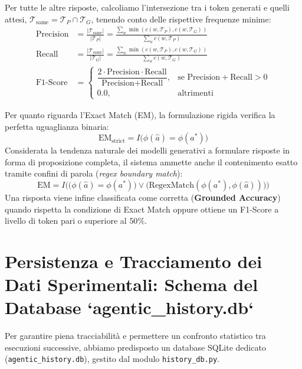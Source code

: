 Per tutte le altre risposte, calcoliamo l'intersezione tra i token generati e quelli attesi, $\mathcal{T}_{\text{same}} = \mathcal{T}_P \cap \mathcal{T}_G$, tenendo conto delle rispettive frequenze minime:
\begin{align}
\text{Precision} &= \frac{|\mathcal{T}_{\text{same}}|}{|\mathcal{T}_P|} = \frac{\sum_{w} \min(c(w, \mathcal{T}_P), c(w, \mathcal{T}_G))}{\sum_{w} c(w, \mathcal{T}_P)} \\[0.2cm]
\text{Recall} &= \frac{|\mathcal{T}_{\text{same}}|}{|\mathcal{T}_G|} = \frac{\sum_{w} \min(c(w, \mathcal{T}_P), c(w, \mathcal{T}_G))}{\sum_{w} c(w, \mathcal{T}_G)} \\[0.2cm]
\text{F1-Score} &= \begin{cases}
    \dfrac{2 \cdot \text{Precision} \cdot \text{Recall}}{\text{Precision} + \text{Recall}}, & \text{se } \text{Precision} + \text{Recall} > 0 \\
    0.0, & \text{altrimenti}
\end{cases}
\end{align}

Per quanto riguarda l'Exact Match (EM), la formulazione rigida verifica la perfetta uguaglianza binaria:
\begin{equation}
\text{EM}_{\text{strict}} = {I}\big(\phi(\hat{a}) = \phi(a^*)\big)
\end{equation}
Considerata la tendenza naturale dei modelli generativi a formulare risposte in forma di proposizione completa, il sistema ammette anche il contenimento esatto tramite confini di parola (\textit{regex boundary match}):
\begin{equation}
\text{EM} = {I}\Big(\big(\phi(\hat{a}) = \phi(a^*)\big) \lor \big(\text{RegexMatch}(\phi(a^*), \phi(\hat{a}))\big)\Big)
\end{equation}
Una risposta viene infine classificata come corretta (\textbf{Grounded Accuracy}) quando rispetta la condizione di Exact Match oppure ottiene un F1-Score a livello di token pari o superiore al $50\%$.

\section{Persistenza e Tracciamento dei Dati Sperimentali: Schema del Database `agentic\_history.db`}
\label{sec:schema_db}

Per garantire piena tracciabilità e permettere un confronto statistico tra esecuzioni successive, abbiamo predisposto un database SQLite dedicato (\texttt{agentic\_history.db}), gestito dal modulo \texttt{history\_db.py}.

